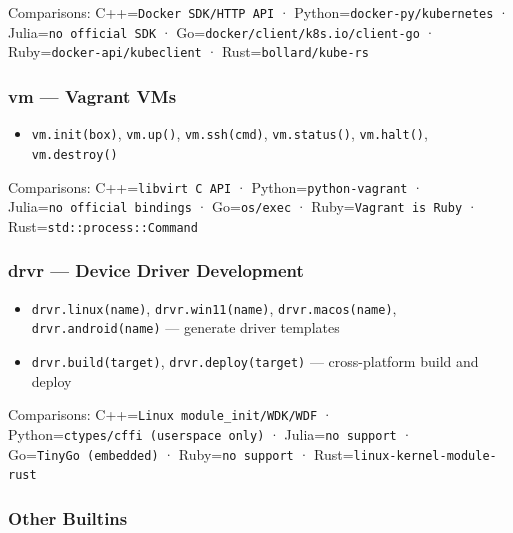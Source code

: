 \documentclass[
]{article}
\providecommand{\tightlist}{%
  \setlength{\itemsep}{0pt}\setlength{\parskip}{0pt}}
\begin{document}
Comparisons: C++=\texttt{Docker\ SDK/HTTP\ API} ·
Python=\texttt{docker-py/kubernetes} · Julia=\texttt{no\ official\ SDK}
· Go=\texttt{docker/client/k8s.io/client-go} ·
Ruby=\texttt{docker-api/kubeclient} · Rust=\texttt{bollard/kube-rs}

\subsubsection{vm --- Vagrant VMs}\label{vm-vagrant-vms}

\begin{itemize}
\tightlist
\item
  \texttt{vm.init(box)}, \texttt{vm.up()}, \texttt{vm.ssh(cmd)},
  \texttt{vm.status()}, \texttt{vm.halt()}, \texttt{vm.destroy()}
\end{itemize}

Comparisons: C++=\texttt{libvirt\ C\ API} ·
Python=\texttt{python-vagrant} · Julia=\texttt{no\ official\ bindings} ·
Go=\texttt{os/exec} · Ruby=\texttt{Vagrant\ is\ Ruby} ·
Rust=\texttt{std::process::Command}

\subsubsection{drvr --- Device Driver
Development}\label{drvr-device-driver-development}

\begin{itemize}
\tightlist
\item
  \texttt{drvr.linux(name)}, \texttt{drvr.win11(name)},
  \texttt{drvr.macos(name)}, \texttt{drvr.android(name)} --- generate
  driver templates
\item
  \texttt{drvr.build(target)}, \texttt{drvr.deploy(target)} ---
  cross-platform build and deploy
\end{itemize}

Comparisons: C++=\texttt{Linux\ module\_init/WDK/WDF} ·
Python=\texttt{ctypes/cffi\ (userspace\ only)} ·
Julia=\texttt{no\ support} · Go=\texttt{TinyGo\ (embedded)} ·
Ruby=\texttt{no\ support} · Rust=\texttt{linux-kernel-module-rust}

\subsubsection{Other Builtins}\label{other-builtins}
\end{document}
